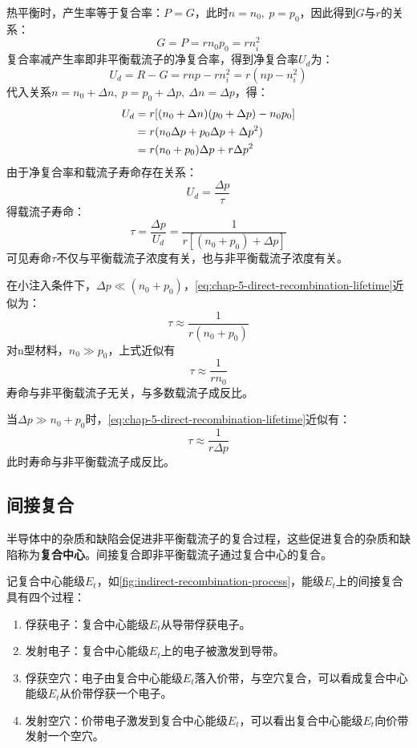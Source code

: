 热平衡时，产生率等于复合率：$P=G$，此时$n=n_0,\ p=p_0$，因此得到$G$与$r$的关系：
\begin{equation}
    G=P=rn_0p_0=rn_i^2
\end{equation}
复合率减产生率即非平衡载流子的净复合率，得到净复合率$U_d$为：
\begin{equation}
    U_d=R-G=rnp-rn_i^2=r(np-n_i^2)
\end{equation}
代入关系$n=n_0+\Delta n,\ p=p_0+\Delta p,\ \Delta n=\Delta p$，得：
\begin{align}
    U_d&=r[(n_0+\Delta n)(p_0+\Delta p)-n_0p_0]\notag\\
    &=r(n_0\Delta p+p_0\Delta p+\Delta p^2)\notag\\
    &=r(n_0+p_0)\Delta p+r\Delta p^2
\end{align}
由于净复合率和载流子寿命存在关系：
\begin{equation}
    U_d=\frac{\Delta p}{\tau}
\end{equation}
得载流子寿命：
\begin{equation}
    \tau=\frac{\Delta p}{U_d}=\frac{1}{r[(n_0+p_0)+\Delta p]}\label{eq:chap-5-direct-recombination-lifetime}
\end{equation}
可见寿命$\tau$不仅与平衡载流子浓度有关，也与非平衡载流子浓度有关。

在小注入条件下，$\Delta p\ll (n_0+p_0)$，\autoref{eq:chap-5-direct-recombination-lifetime}近似为：
\begin{equation}
    \tau\approx\frac{1}{r(n_0+p_0)}
\end{equation}
对n型材料，$n_0\gg p_0$，上式近似有
\begin{equation}
    \tau\approx\frac{1}{rn_0}
\end{equation}
寿命与非平衡载流子无关，与多数载流子成反比。

当$\Delta p\gg n_0+p_0$时，\autoref{eq:chap-5-direct-recombination-lifetime}近似有：
\begin{equation}
    \tau\approx\frac{1}{r\Delta p}
\end{equation}
此时寿命与非平衡载流子成反比。

\subsection{间接复合}

半导体中的杂质和缺陷会促进非平衡载流子的复合过程，这些促进复合的杂质和缺陷称为\textbf{复合中心}。间接复合即非平衡载流子通过复合中心的复合。

记复合中心能级$E_t$，如\autoref{fig:indirect-recombination-process}，能级$E_t$上的间接复合具有四个过程：
\begin{enumerate}[(1)]
    \item 俘获电子：复合中心能级$E_t$从导带俘获电子。
    \item 发射电子：复合中心能级$E_t$上的电子被激发到导带。
    \item 俘获空穴：电子由复合中心能级$E_t$落入价带，与空穴复合，可以看成复合中心能级$E_t$从价带俘获一个电子。
    \item 发射空穴：价带电子激发到复合中心能级$E_t$，可以看出复合中心能级$E_t$向价带发射一个空穴。
\end{enumerate}

